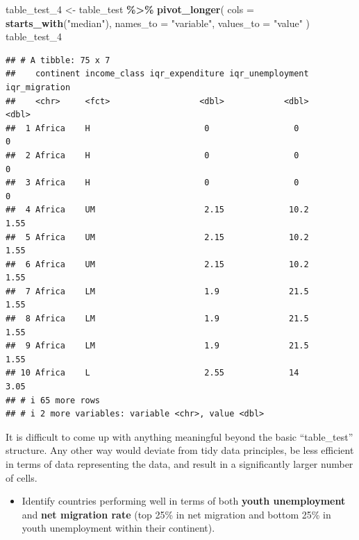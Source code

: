 \documentclass[
]{article}
\newenvironment{Shaded}{\begin{snugshade}}{\end{snugshade}}
\newcommand{\AttributeTok}[1]{\textcolor[rgb]{0.13,0.29,0.53}{#1}}
\newcommand{\FunctionTok}[1]{\textcolor[rgb]{0.13,0.29,0.53}{\textbf{#1}}}
\newcommand{\NormalTok}[1]{#1}
\newcommand{\OtherTok}[1]{\textcolor[rgb]{0.56,0.35,0.01}{#1}}
\newcommand{\SpecialCharTok}[1]{\textcolor[rgb]{0.81,0.36,0.00}{\textbf{#1}}}
\newcommand{\StringTok}[1]{\textcolor[rgb]{0.31,0.60,0.02}{#1}}
\providecommand{\tightlist}{%
  \setlength{\itemsep}{0pt}\setlength{\parskip}{0pt}}
\begin{document}
\begin{Shaded}
\begin{Highlighting}[]
\NormalTok{table\_test\_4 }\OtherTok{\textless{}{-}}\NormalTok{ table\_test }\SpecialCharTok{\%\textgreater{}\%}
  \FunctionTok{pivot\_longer}\NormalTok{(}
    \AttributeTok{cols =} \FunctionTok{starts\_with}\NormalTok{(}\StringTok{"median"}\NormalTok{),}
    \AttributeTok{names\_to =} \StringTok{"variable"}\NormalTok{,}
    \AttributeTok{values\_to =} \StringTok{"value"}
\NormalTok{  )}
\NormalTok{table\_test\_4}
\end{Highlighting}
\end{Shaded}

\begin{verbatim}
## # A tibble: 75 x 7
##    continent income_class iqr_expenditure iqr_unemployment iqr_migration
##    <chr>     <fct>                  <dbl>            <dbl>         <dbl>
##  1 Africa    H                       0                 0            0   
##  2 Africa    H                       0                 0            0   
##  3 Africa    H                       0                 0            0   
##  4 Africa    UM                      2.15             10.2          1.55
##  5 Africa    UM                      2.15             10.2          1.55
##  6 Africa    UM                      2.15             10.2          1.55
##  7 Africa    LM                      1.9              21.5          1.55
##  8 Africa    LM                      1.9              21.5          1.55
##  9 Africa    LM                      1.9              21.5          1.55
## 10 Africa    L                       2.55             14            3.05
## # i 65 more rows
## # i 2 more variables: variable <chr>, value <dbl>
\end{verbatim}

It is difficult to come up with anything meaningful beyond the basic
``table\_test'' structure. Any other way would deviate from tidy data
principles, be less efficient in terms of data representing the data,
and result in a significantly larger number of cells.

\begin{itemize}
\tightlist
\item
  Identify countries performing well in terms of both \textbf{youth
  unemployment} and \textbf{net migration rate} (top 25\% in net
  migration and bottom 25\% in youth unemployment within their
  continent).
\end{itemize}
\end{document}
